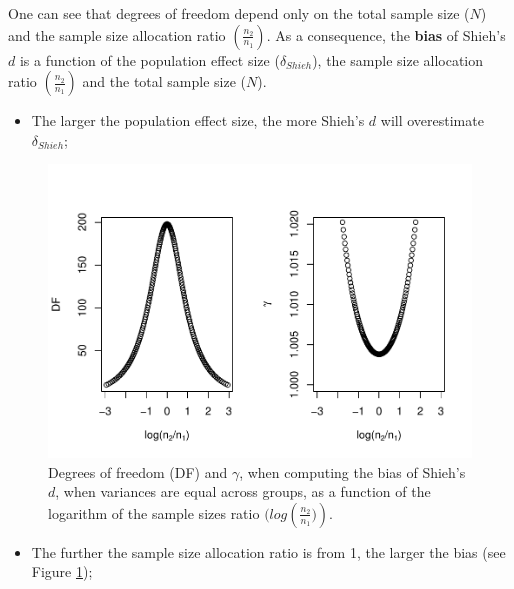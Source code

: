 \documentclass[
  english,
  man,mask]{apa6}
\providecommand{\tightlist}{%
  \setlength{\itemsep}{0pt}\setlength{\parskip}{0pt}}
\begin{document}
One can see that degrees of freedom depend only on the total sample size (\(N\)) and the sample size allocation ratio \(\left( \frac{n_2}{n_1}\right)\). As a consequence, the \textbf{bias} of Shieh's \(d\) is a function of the population effect size (\(\delta_{Shieh}\)), the sample size allocation ratio \(\left( \frac{n_2}{n_1}\right)\) and the total sample size (\(N\)).

\begin{itemize}
\tightlist
\item
  The larger the population effect size, the more Shieh's \(d\) will overestimate \(\delta_{Shieh}\);
\end{itemize}

\begin{figure}
\centering
\includegraphics{Theoretical-Bias-of-all-estimators-as-a-function-of-population-parameters_files/figure-latex/biasshiehhomNratio2-1.pdf}
\caption{\label{fig:biasshiehhomNratio2}Degrees of freedom (DF) and \(\gamma\), when computing the bias of Shieh's \(d\), when variances are equal across groups, as a function of the logarithm of the sample sizes ratio \((log \left(\frac{n_2}{n_1})\right)\).}
\end{figure}

\begin{itemize}
\tightlist
\item
  The further the sample size allocation ratio is from 1, the larger the bias (see Figure \ref{fig:biasshiehhomNratio2});
\end{itemize}
\end{document}
